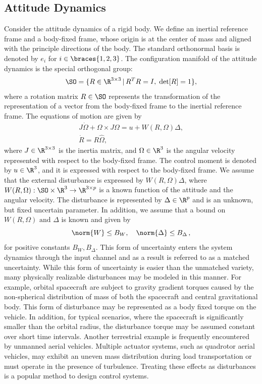 \subsection{Attitude Dynamics}\label{sec:att_dyn}
Consider the attitude dynamics of a rigid body.
We define an inertial reference frame and a body-fixed frame, whose origin is at the center of mass and aligned with the principle directions of the body. 
The standard orthonormal basis is denoted by \( e_i \) for \( i \in \braces{1, 2, 3} \).
The configuration manifold of the attitude dynamics is the special orthogonal group:
\begin{align*}
	\SO = \{R\in\R^{3\times 3}\,|\, R^TR=I,\;\mathrm{det}[R]=1\} ,
\end{align*}
where a rotation matrix $R\in\SO$ represents the transformation of the representation of a vector from the body-fixed frame to the inertial reference frame. 
The equations of motion are given by
\begin{gather}
	J\dot\Omega + \Omega\times J\Omega = u+W(R,\Omega)\Delta ,\label{eqn:Wdot}\\
	\dot R = R\hat\Omega ,\label{eqn:Rdot}
\end{gather}
where $J\in\R^{3\times 3}$ is the inertia matrix, and $\Omega\in\R^{3}$ is the angular velocity represented with respect to the body-fixed frame. 
The control moment is denoted by $u\in\R^{3}$, and it is expressed with respect to the body-fixed frame. 
We assume that the external disturbance is expressed by $W(R,\Omega)\Delta$, where $W(R,\Omega):\SO\times\R^{3}\rightarrow \R^{3\times p}$ is a known function of the attitude and the angular velocity.
The disturbance is represented by $\Delta\in\R^{p}$ and is an unknown, but fixed uncertain parameter.
In addition, we assume that a bound on \( W(R, \Omega) \text{ and } \Delta \) is known and given by
\begin{equation}
	\norm{W} \leq B_W , \quad \norm{\Delta} \leq B_\Delta \,, \label{eqn:W_bound}
\end{equation}
for positive constants \( B_W, B_\Delta\).
This form of uncertainty enters the system dynamics through the input channel and as a result is referred to as a matched uncertainty. 
While this form of uncertainty is easier than the unmatched variety, many physically realizable disturbances may be modeled in this manner.
For example, orbital spacecraft are subject to gravity gradient torques caused by the non-spherical distribution of mass of both the spacecraft and central gravitational body.
This form of disturbance may be represented as a body fixed torque on the vehicle.
In addition, for typical scenarios, where the spacecraft is significantly smaller than the orbital radius, the disturbance torque may be assumed constant over short time intervals.
Another terrestrial example is frequently encountered by unmanned aerial vehicles. 
Multiple actuator systems, such as quadrotor aerial vehicles, may exhibit an uneven mass distribution during load transportation or must operate in the presence of turbulence. 
Treating these effects as disturbances is a popular method to design control systems.


